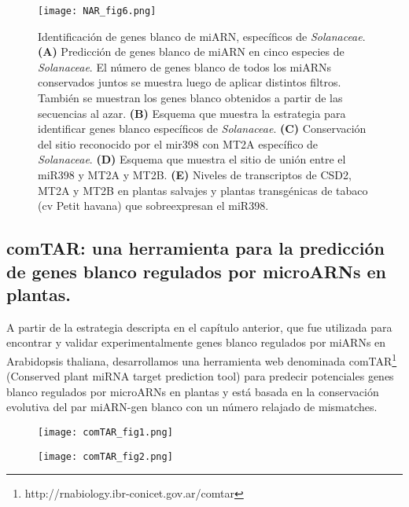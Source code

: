 \begin{figure}[htbp!] 
    \centering    
    \texttt{[image: NAR\_fig6.png]}
    \caption[]{Identificación de genes blanco de miARN, específicos de \textit{Solanaceae}.
    \textbf{(A)} Predicción de genes blanco de miARN en cinco especies de \textit{Solanaceae}.
    El número de genes blanco de todos los miARNs conservados juntos se muestra luego de aplicar distintos filtros.
    También se muestran los genes blanco obtenidos a partir de las secuencias al azar.
    \textbf{(B)} Esquema que muestra la estrategia para identificar genes blanco específicos de \textit{Solanaceae}.
    \textbf{(C)} Conservación del sitio reconocido por el mir398 con MT2A específico de \textit{Solanaceae}.
    \textbf{(D)} Esquema que muestra el sitio de unión entre el miR398 y MT2A y MT2B.
    \textbf{(E)} Niveles de transcriptos de CSD2, MT2A y MT2B en plantas salvajes y plantas transgénicas de tabaco (cv Petit havana) que sobreexpresan el miR398.  }
    \label{fig:NAR_fig6}
\end{figure}


\subsection{comTAR: una herramienta para la predicción de genes blanco regulados por microARNs en plantas.} 

A partir de la estrategia descripta en el capítulo anterior, que fue utilizada para encontrar y validar experimentalmente genes blanco regulados por miARNs en Arabidopsis thaliana,
 desarrollamos una herramienta web denominada comTAR\footnote{http://rnabiology.ibr-conicet.gov.ar/comtar} (Conserved plant miRNA target prediction tool) \citep{Chorostecki2014}
 para predecir potenciales genes blanco regulados por microARNs en plantas y está basada en la conservación evolutiva del par miARN-gen blanco con un número relajado de mismatches.

\begin{figure}[htbp!] 
    \centering    
    \texttt{[image: comTAR\_fig1.png]}
    \caption[]{ }
    \label{fig:comTAR_fig1}
\end{figure}


\begin{figure}[htbp!] 
    \centering    
    \texttt{[image: comTAR\_fig2.png]}
    \caption[]{ }
    \label{fig:comTAR_fig2}
\end{figure}



